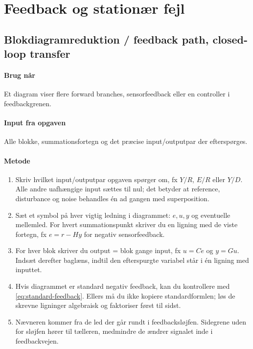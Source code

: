 \section{Feedback og stationær fejl}
\label{sec:feedback}

\subsection{Blokdiagramreduktion / feedback path, closed-loop transfer}

\paragraph{Brug når}
Et diagram viser flere forward branches, sensorfeedback eller en controller i
feedbackgrenen.

\paragraph{Input fra opgaven}
Alle blokke, summationsfortegn og det præcise input/outputpar der efterspørges.

\paragraph{Metode}
\begin{enumerate}
\item Skriv hvilket input/outputpar opgaven spørger om, fx \(Y/R\), \(E/R\) eller
      \(Y/D\). Alle andre uafhængige input sættes til nul; det betyder at reference,
      disturbance og noise behandles én ad gangen med superposition.
\item Sæt et symbol på hver vigtig ledning i diagrammet: \(e,u,y\) og eventuelle
      mellemled. For hvert summationspunkt skriver du en ligning med de viste fortegn,
      fx \(e=r-Hy\) for negativ sensorfeedback.
\item For hver blok skriver du output = blok gange input, fx \(u=Ce\) og \(y=Gu\).
      Indsæt derefter baglæns, indtil den efterspurgte variabel står i én ligning med
      inputtet.
\item Hvis diagrammet er standard negativ feedback, kan du kontrollere med
      \eqref{eq:standard-feedback}. Ellers må du ikke kopiere standardformlen; løs de
      skrevne ligninger algebraisk og faktoriser først til sidst.
\item Nævneren kommer fra de led der går rundt i feedbacksløjfen. Sidegrene uden for
      sløjfen hører til tælleren, medmindre de ændrer signalet inde i feedbackvejen.
\end{enumerate}

